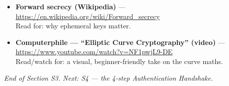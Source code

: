 \documentclass[11pt,a4paper]{article}
\begin{document}
\begin{itemize}
        \url{https://en.wikipedia.org/wiki/Galois/Counter_Mode}\\
        Read for: how the GCM tag is built.
  \item \textbf{Forward secrecy (Wikipedia)} ---
        \url{https://en.wikipedia.org/wiki/Forward_secrecy}\\
        Read for: why ephemeral keys matter.
  \item \textbf{Computerphile --- ``Elliptic Curve Cryptography'' (video)} ---
        \url{https://www.youtube.com/watch?v=NF1pwjL9-DE}\\
        Read/watch for: a visual, beginner-friendly take on the curve maths.
\end{itemize}

\vfill
\begin{center}\footnotesize\itshape
End of Section S3. Next: S4 --- the 4-step Authentication Handshake.
\end{center}
\end{document}
